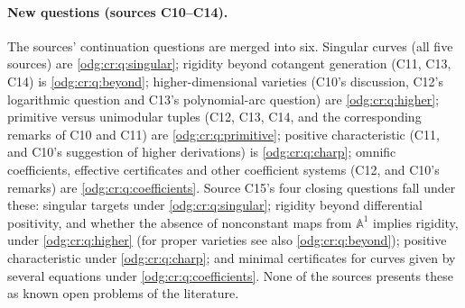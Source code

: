 \documentclass[11pt,oneside]{article}
\numberwithin{equation}{section}
\theoremstyle{definition}
\theoremstyle{remark}
\newcommand{\Aff}{\mathbb A}
\begin{document}
\paragraph{New questions (sources C10--C14).} The sources' continuation questions
are merged into six. Singular curves (all five sources) are
\cref{odg:cr:q:singular}; rigidity beyond cotangent generation (C11, C13, C14) is
\cref{odg:cr:q:beyond}; higher-dimensional varieties (C10's discussion, C12's
logarithmic question and C13's polynomial-arc question) are \cref{odg:cr:q:higher};
primitive versus unimodular tuples (C12, C13, C14, and the corresponding remarks of
C10 and C11) are \cref{odg:cr:q:primitive}; positive characteristic (C11, and C10's
suggestion of higher derivations) is \cref{odg:cr:q:charp}; omnific coefficients,
effective certificates and other coefficient systems (C12, and C10's remarks) are
\cref{odg:cr:q:coefficients}. Source C15's four closing questions fall under these:
singular targets under \cref{odg:cr:q:singular}; rigidity beyond differential positivity,
and whether the absence of nonconstant maps from $\Aff^1$ implies rigidity, under
\cref{odg:cr:q:higher} (for proper varieties see also \cref{odg:cr:q:beyond}); positive
characteristic under \cref{odg:cr:q:charp}; and minimal certificates for curves given by
several equations under \cref{odg:cr:q:coefficients}. None of the sources presents these
as known open problems of the literature.
\end{document}

